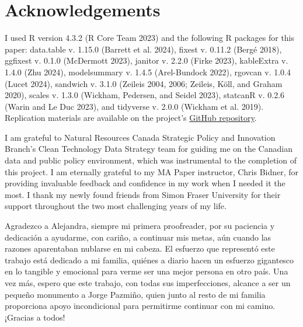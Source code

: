 \documentclass[../main.tex]{subfiles}
\begin{document}
\section*{Acknowledgements}
\label{sec:acknowledgements}

I used R version 4.3.2 (R Core Team 2023) and the following R packages for this paper: data.table v. 1.15.0 (Barrett et al. 2024), fixest v. 0.11.2 (Bergé 2018), ggfixest v. 0.1.0 (McDermott 2023), janitor v. 2.2.0 (Firke 2023), kableExtra v. 1.4.0 (Zhu 2024), modelsummary v. 1.4.5 (Arel-Bundock 2022), rgovcan v. 1.0.4 (Lucet 2024), sandwich v. 3.1.0 (Zeileis 2004, 2006; Zeileis, Köll, and Graham 2020), scales v. 1.3.0 (Wickham, Pedersen, and
Seidel 2023), statcanR v. 0.2.6 (Warin and Le Duc 2023), and tidyverse v. 2.0.0 (Wickham et al. 2019). Replication materials are available on the project's \href{https://github.com/dsanchezp18/econ899}{GitHub repository}.

I am grateful to Natural Resources Canada Strategic Policy and Innovation Branch's Clean Technology Data Strategy team for guiding me on the Canadian data and public policy environment, which was instrumental to the completion of this project. I am eternally grateful to my MA Paper instructor, Chris Bidner, for providing invaluable feedback and confidence in my work when I needed it the most. I thank my newly found friends from Simon Fraser University for their support throughout the two most challenging years of my life.

Agradezco a Alejandra, siempre mi primera proofreader, por su paciencia y dedicación a ayudarme, con cariño, a continuar mis metas, aún cuando las razones aparentaban nublarse en mi cabeza. El esfuerzo que representó este trabajo está dedicado a mi familia, quiénes a diario hacen un esfuerzo gigantesco en lo tangible y emocional para verme ser una mejor persona en otro país. Una vez más, espero que este trabajo, con todas sus imperfecciones, alcance a ser un pequeño monumento a Jorge Pazmiño, quien junto al resto de mi familia proporciona apoyo incondicional para permitirme continuar con mi camino. ¡Gracias a todos! %
\end{document}
